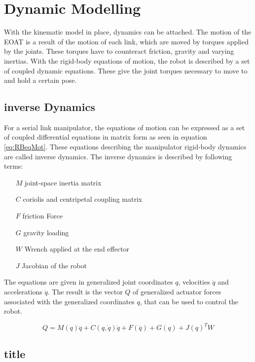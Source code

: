 \section{Dynamic Modelling}

With the kinematic model in place, dynamics can be attached. The motion of the \ac{EOAT} is a result of the motion of each link, which are moved by torques applied by the joints. These torques have to counteract friction, gravity and varying inertias.
With the rigid-body equations of motion, the robot is described by a set of coupled dynamic equations. These give the joint torques necessary to move to and hold a certain pose.

\subsection{inverse Dynamics}

For a serial link manipulator, the equations of motion can be expressed as a set of coupled differential equations in matrix form as seen in equation \ref{eq:RBeqMot}. These equations describing the manipulator rigid-body dynamics are called inverse dynamics.
The inverse dynamics is described by following terms:
\begin{itemize}
	\item[$ M $] joint-space inertia matrix
	\item[$ C $] coriolis and centripetal coupling matrix
	\item[$ F $] friction Force
	\item[$ G $] gravity loading
	\item[$ W $] Wrench applied at the end effector
	\item[$ J $] Jacobian of the robot
\end{itemize}
The equations are given in generalized joint coordinates $q$, velocities $\dot{q}$ and accelerations $\ddot{q}$.
The result is the vector $Q$ of generalized actuator forces associated with the generalized coordinates $ q$, that can be used to control the robot.

\begin{equation}\label{eq:RBeqMot}
	Q=M(q)\ddot{q}+C(q,\dot{q})\dot{q}+F(\dot{q})+G(q)+J(q)^TW
\end{equation}


\subsection{title}




